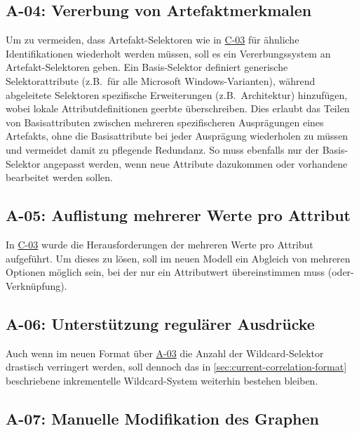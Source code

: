 \subsection{A-04: Vererbung von Artefaktmerkmalen}\label{subsec:req-selektor-inheritance}

Um zu vermeiden, dass Artefakt-Selektoren wie in \hyperref[subsec:c-03-duplizierte-artefakt-selektoren]{C-03} für ähnliche Identifikationen wiederholt werden müssen, soll es ein Vererbungssystem an Artefakt-Selektoren geben.
Ein Basis-Selektor definiert generische Selektorattribute (z.B.\ für alle Microsoft Windows-Varianten), während abgeleitete Selektoren spezifische Erweiterungen (z.B.\ Architektur) hinzufügen, wobei lokale Attributdefinitionen geerbte überschreiben.
Dies erlaubt das Teilen von Basisattributen zwischen mehreren spezifischeren Ausprägungen eines Artefakts, ohne die Basisattribute bei jeder Ausprägung wiederholen zu müssen und vermeidet damit zu pflegende Redundanz.
So muss ebenfalls nur der Basis-Selektor angepasst werden, wenn neue Attribute dazukommen oder vorhandene bearbeitet werden sollen.

\subsection{A-05: Auflistung mehrerer Werte pro Attribut}\label{subsec:req-multiple-attribute-values}

In \hyperref[subsec:c-03-duplizierte-artefakt-selektoren]{C-03} wurde die Herausforderungen der mehreren Werte pro Attribut aufgeführt.
Um dieses zu lösen, soll im neuen Modell ein Abgleich von mehreren Optionen möglich sein, bei der nur ein Attributwert übereinstimmen muss (oder-Verknüpfung).

\subsection{A-06: Unterstützung regulärer Ausdrücke}\label{subsec:req-regex-support}

Auch wenn im neuen Format über \hyperref[subsec:req-type-specific-matching]{A-03} die Anzahl der Wildcard-Selektor drastisch verringert werden, soll dennoch das in \autoref{sec:current-correlation-format} beschriebene inkrementelle Wildcard-System weiterhin bestehen bleiben.

\subsection{A-07: Manuelle Modifikation des Graphen}\label{subsec:req-manual-format-modification}

